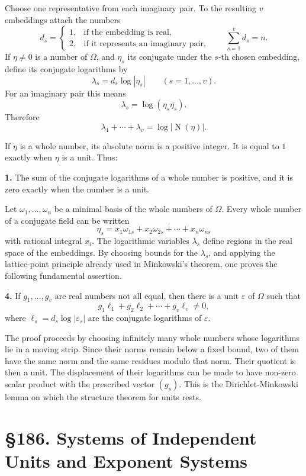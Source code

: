 \documentclass[11pt,a4paper]{book}
\newcommand{\webersection}[2]{\clearpage\section*{\S #1. #2}}
\providecommand{\N}{\operatorname{N}}
\begin{document}
Choose one representative from each imaginary pair.  To the resulting \(v\) embeddings attach the numbers
\[
  d_s=\begin{cases}
  1,&\text{if the embedding is real},\\
  2,&\text{if it represents an imaginary pair},
  \end{cases}
\qquad
  \sum_{s=1}^v d_s=n.
\tag{1}
\]
If \(\eta\ne0\) is a number of \(\Omega\), and \(\eta_s\) its conjugate under the \(s\)-th chosen embedding, define its conjugate logarithms by
\[
  \lambda_s=d_s\log|\eta_s|\qquad(s=1,
\ldots,v).
\tag{2}
\]
For an imaginary pair this means
\[
  \lambda_s=\log(\eta_s\overline{\eta_s}).
\]
Therefore
\[
  \lambda_1+\cdots+\lambda_v=\log|
\N(\eta)|.
\tag{3}
\]

If \(\eta\) is a whole number, its absolute norm is a positive integer.  It is equal to \(1\) exactly when \(\eta\) is a unit.  Thus:

\textbf{1.} The sum of the conjugate logarithms of a whole number is positive, and it is zero exactly when the number is a unit.

Let \(\omega_1,
\ldots,
\omega_n\) be a minimal basis of the whole numbers of \(\Omega\).  Every whole number of a conjugate field can be written
\[
  \eta_s=x_1\omega_{1s}+x_2\omega_{2s}+\cdots+x_n\omega_{ns}
\tag{4}
\]
with rational integral \(x_i\).  The logarithmic variables \(\lambda_s\) define regions in the real space of the embeddings.  By choosing bounds for the \(\lambda_s\), and applying the lattice-point principle already used in Minkowski's theorem, one proves the following fundamental assertion.

\textbf{4.} If \(g_1,
\ldots,g_v\) are real numbers not all equal, then there is a unit \(\varepsilon\) of \(\Omega\) such that
\[
  g_1\ell_1+g_2\ell_2+\cdots+g_v\ell_v\ne0,
\tag{5}
\]
where \(\ell_s=d_s\log|\varepsilon_s|\) are the conjugate logarithms of \(\varepsilon\).

The proof proceeds by choosing infinitely many whole numbers whose logarithms lie in a moving strip.  Since their norms remain below a fixed bound, two of them have the same norm and the same residues modulo that norm.  Their quotient is then a unit.  The displacement of their logarithms can be made to have non-zero scalar product with the prescribed vector \((g_s)\).  This is the Dirichlet-Minkowski lemma on which the structure theorem for units rests.

\webersection{186}{Systems of Independent Units and Exponent Systems}
\end{document}
